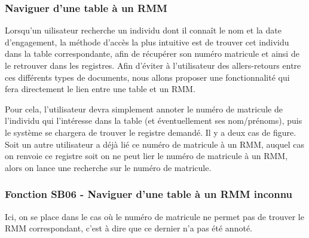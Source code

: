 \documentclass[a4paper]{article}
\begin{document}
\subsubsection{Naviguer d'une table à un RMM}

Lorsqu'un uilisateur recherche un individu dont il connaît le nom et la date d'engagement, la méthode d'accès la plus intuitive est de trouver cet individu dans la table correspondante, afin de récupérer son numéro matricule et ainsi de le retrouver dans les registres. Afin d'éviter à l'utilisateur des allers-retours entre ces différents types de documents, nous allons proposer une fonctionnalité qui fera directement le lien entre une table et un RMM.

Pour cela, l'utilisateur devra simplement annoter le numéro de matricule de l'individu qui l'intéresse dans la table (et éventuellement ses nom/prénoms), puis le système se chargera de trouver le registre demandé. Il y a deux cas de figure. Soit un autre utilisateur a déjà lié ce numéro de matricule à un RMM, auquel cas on renvoie ce registre soit on ne peut lier le numéro de matricule à un RMM, alors on lance une recherche sur le numéro de matricule. 

\subsubsection{Fonction SB06 - Naviguer d'une table à un RMM inconnu}

Ici, on se place dans le cas où le numéro de matricule ne permet pas de trouver le RMM correspondant, c'est à dire que ce dernier n'a pas été annoté. 
\end{document}
